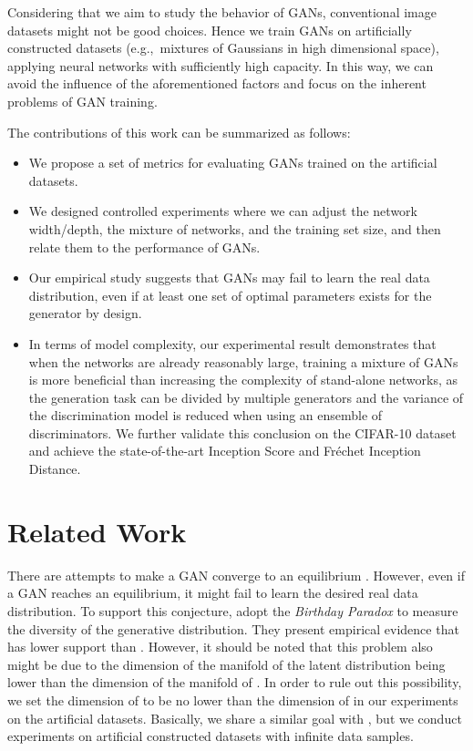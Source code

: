 \documentclass[conference]{IEEEtran}
\newcommand{\eg}{{e.g.,~}}
\begin{document}
Considering that we aim to study the behavior of GANs, conventional image datasets might not be good choices.
Hence we train GANs on artificially constructed datasets (\eg mixtures of Gaussians in high dimensional space), applying neural networks with sufficiently high capacity. In this way, we can avoid the influence of the aforementioned factors and focus on the inherent problems of GAN training.

The contributions of this work can be summarized as follows:
\begin{itemize}
	\item We propose a set of metrics for evaluating GANs trained on the artificial datasets.
	\item We designed controlled experiments where we can adjust the network width/depth, the mixture of networks, and the training set size, and then relate them to the performance of GANs.
	\item Our empirical study suggests that GANs may fail to learn the real data distribution, even if at least one set of optimal parameters exists for the generator by design. 
	\item In terms of model complexity, our experimental result demonstrates that when the networks are already reasonably large, training a mixture of GANs is more beneficial than increasing the complexity of stand-alone networks, as the generation task can be divided by multiple generators and the variance of the discrimination model is reduced when using an ensemble of discriminators. We further validate this conclusion on the CIFAR-10 dataset and achieve the state-of-the-art Inception Score and Fréchet Inception Distance.
\end{itemize}


 

\section{Related Work}
There are attempts to make a GAN converge to an equilibrium \cite{generalization,FID,mescheder2018training}. However, even if a GAN reaches an equilibrium, it might fail to learn the desired real data distribution. To support this conjecture, \cite{dogans} adopt the \textit{Birthday Paradox} to measure the diversity of the generative distribution. They present empirical evidence that  has lower support than . 
However, it should be noted that this problem also might be due to the dimension of the manifold of the latent distribution being lower than the dimension of the manifold of \cite{towardsprincipled}.
In order to rule out this possibility, we set the dimension of  to be no lower than the dimension of  in our experiments on the artificial datasets.
Basically, we share a similar goal with \cite{dogans}, but we conduct experiments on artificial constructed datasets with infinite data samples. 
\end{document}
